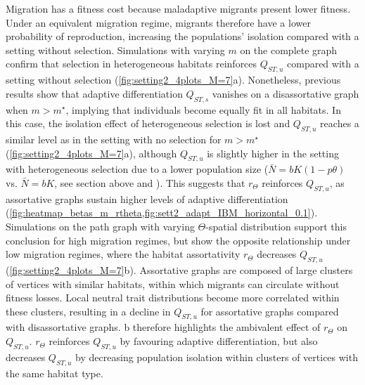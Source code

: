 Migration has a fitness cost because maladaptive migrants present lower fitness. Under an equivalent migration regime, migrants therefore have a lower probability of reproduction, increasing the populations' isolation compared with a setting without selection.
%
Simulations with varying $m$ on the complete graph confirm that selection in heterogeneous habitats reinforces $Q_{ST,u}$ compared with a setting without selection (\cref{fig:setting2_4plots_M=7}a). 
%
Nonetheless, previous results show that adaptive differentiation $Q_{ST,s}$ vanishes on a disassortative graph when $m > m^\star$, implying that individuals become equally fit in all habitats. 
%
In this case, the isolation effect of heterogeneous selection is lost and $Q_{ST,u}$ reaches a similar level as in the setting with no selection for $m > m^\star$ (\cref{fig:setting2_4plots_M=7}a), although $Q_{ST,u}$ is slightly higher in the setting with heterogeneous selection due to a lower population size ($\bar{N}=bK(1-p \theta)$ vs. $\bar{N}=bK$, see section above and ). %
%
This suggests that $r_\Theta$ reinforces $Q_{ST,u}$, as assortative graphs sustain higher levels of adaptive differentiation (\cref{fig:heatmap_betas_m_rtheta,fig:sett2_adapt_IBM_horizontal_0.1}). 
%
Simulations on the path graph with varying $\Theta$-spatial distribution support this conclusion for high migration regimes, but show the opposite relationship under low migration regimes, where the habitat assortativity $r_\Theta$ decreases $Q_{ST,u}$ (\cref{fig:setting2_4plots_M=7}b).
%
Assortative graphs are composed of large clusters of vertices with similar habitats, within which migrants can circulate without fitness losses. Local neutral trait distributions become more correlated within these clusters, resulting in a decline in $Q_{ST,u}$ for assortative graphs compared with disassortative graphs.  
%
b therefore highlights the ambivalent effect of $r_\Theta$ on $Q_{ST,u}$. $r_\Theta$ reinforces $Q_{ST,u}$ by favouring adaptive differentiation, but also decreases $Q_{ST,u}$ by decreasing population isolation within clusters of vertices with the same habitat type. 

